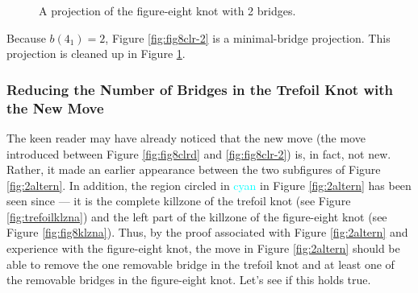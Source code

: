 \documentclass[titlepage]{article}
\begin{document}
\begin{figure}[h!]
    \centering
    \caption{A projection of the figure-eight knot with 2 bridges.}
    \label{fig:fig8fin}
\end{figure}

Because $b(4_1)=2$, Figure \ref{fig:fig8clr-2} is a minimal-bridge projection. This projection is cleaned up in Figure \ref{fig:fig8fin}.


\subsubsection{Reducing the Number of Bridges in the Trefoil Knot with the New Move}\label{ss2:trefoilreduce-2}
The keen reader may have already noticed that the new move (the move introduced between Figure \ref{fig:fig8clrd} and \ref{fig:fig8clr-2}) is, in fact, not new. Rather, it made an earlier appearance between the two subfigures of Figure \ref{fig:2altern}. In addition, the region circled in \textcolor{cyan}{cyan} in Figure \ref{fig:2altern} has been seen since --- it is the complete killzone of the trefoil knot (see Figure \ref{fig:trefoilklzna}) and the left part of the killzone of the figure-eight knot (see Figure \ref{fig:fig8klzna}). Thus, by the proof associated with Figure \ref{fig:2altern} and experience with the figure-eight knot, the move in Figure \ref{fig:2altern} should be able to remove the one removable bridge in the trefoil knot and at least one of the removable bridges in the figure-eight knot. Let's see if this holds true.\par
\end{document}
